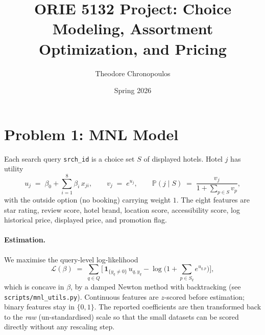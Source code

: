 \documentclass[11pt]{article}
\title{ORIE 5132 Project: Choice Modeling, Assortment Optimization, and Pricing}
\author{Theodore Chronopoulos}
\date{Spring 2026}
\begin{document}
\maketitle

\section*{Problem 1: MNL Model}
\label{sec:p1}

Each search query \texttt{srch\_id} is a choice set $S$ of displayed hotels.
Hotel $j$ has utility
\[
u_j \;=\; \beta_0 + \sum_{i=1}^{8} \beta_i\, x_{ji},
\qquad
v_j \;=\; e^{u_j},
\qquad
\mathbb{P}(j \mid S) \;=\; \frac{v_j}{1 + \sum_{p \in S} v_p},
\]
with the outside option (no booking) carrying weight $1$.
The eight features are star rating, review score, hotel brand, location score,
accessibility score, log historical price, displayed price, and promotion flag.

\paragraph{Estimation.}
We maximise the query-level log-likelihood
\[
\mathcal{L}(\beta) \;=\;
\sum_{q \in Q}\!\Big[\, \mathbf{1}_{\{y_q \ne 0\}}\, u_{q,y_q}
  - \log\!\Big(1 + \sum_{p \in S_q} e^{u_{q,p}}\Big) \Big],
\]
which is concave in $\beta$, by a damped Newton method with backtracking
(see \texttt{scripts/mnl\_utils.py}).
Continuous features are $z$-scored before estimation; binary features stay
in $\{0,1\}$. The reported coefficients are then transformed back to the
\emph{raw} (un-standardised) scale so that the small datasets can be scored
directly without any rescaling step.
\end{document}
